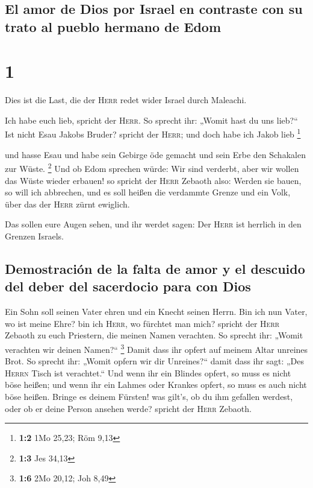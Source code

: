\hypertarget{el-amor-de-dios-por-israel-en-contraste-con-su-trato-al-pueblo-hermano-de-edom}{%
\subsection{El amor de Dios por Israel en contraste con su trato al
pueblo hermano de
Edom}\label{el-amor-de-dios-por-israel-en-contraste-con-su-trato-al-pueblo-hermano-de-edom}}

\hypertarget{section}{%
\section{1}\label{section}}

 Dies ist die Last, die der \textsc{Herr} redet wider
Israel durch Maleachi.

 Ich habe euch lieb, spricht der \textsc{Herr}. So sprecht
ihr: „Womit hast du uns lieb?{}`` Ist nicht Esau Jakobs Bruder? spricht
der \textsc{Herr}; und doch habe ich Jakob lieb \footnote{\textbf{1:2}
  1Mo 25,23; Röm 9,13}

 und hasse Esau und habe sein Gebirge öde gemacht und sein
Erbe den Schakalen zur Wüste. \footnote{\textbf{1:3} Jes 34,13}
 Und ob Edom sprechen würde: Wir sind verderbt, aber wir
wollen das Wüste wieder erbauen! so spricht der \textsc{Herr} Zebaoth
also: Werden sie bauen, so will ich abbrechen, und es soll heißen die
verdammte Grenze und ein Volk, über das der \textsc{Herr} zürnt
ewiglich.

 Das sollen eure Augen sehen, und ihr werdet sagen: Der
\textsc{Herr} ist herrlich in den Grenzen Israels.

\hypertarget{demostraciuxf3n-de-la-falta-de-amor-y-el-descuido-del-deber-del-sacerdocio-para-con-dios}{%
\subsection{Demostración de la falta de amor y el descuido del deber del
sacerdocio para con
Dios}\label{demostraciuxf3n-de-la-falta-de-amor-y-el-descuido-del-deber-del-sacerdocio-para-con-dios}}

 Ein Sohn soll seinen Vater ehren und ein Knecht seinen
Herrn. Bin ich nun Vater, wo ist meine Ehre? bin ich \textsc{Herr}, wo
fürchtet man mich? spricht der \textsc{Herr} Zebaoth zu euch Priestern,
die meinen Namen verachten. So sprecht ihr: „Womit verachten wir deinen
Namen?{}`` \footnote{\textbf{1:6} 2Mo 20,12; Joh 8,49} 
Damit dass ihr opfert auf meinem Altar unreines Brot. So sprecht ihr:
„Womit opfern wir dir Unreines?{}`` damit dass ihr sagt: „Des
\textsc{Herrn} Tisch ist verachtet.``  Und wenn ihr ein
Blindes opfert, so muss es nicht böse heißen; und wenn ihr ein Lahmes
oder Krankes opfert, so muss es auch nicht böse heißen. Bringe es deinem
Fürsten! was gilt's, ob du ihm gefallen werdest, oder ob er deine Person
ansehen werde? spricht der \textsc{Herr} Zebaoth.

